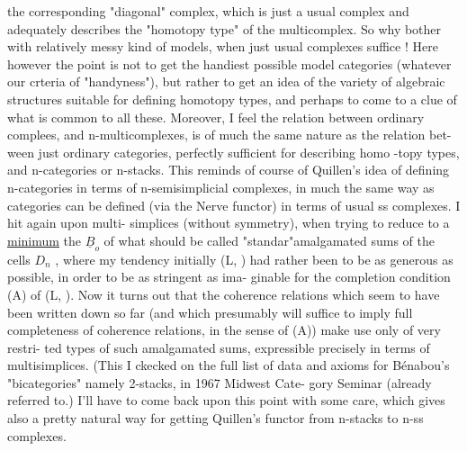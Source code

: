 the corresponding "diagonal" complex,  which is just a usual complex and
adequately describes the "homotopy type" of the multicomplex. So why
bother with relatively messy kind of models,  when just usual complexes
suffice !  Here however the point is not to get the handiest possible
model categories (whatever our crteria of "handyness"),  but rather to
get an idea of the variety of algebraic structures suitable for defining
homotopy types,  and perhaps to come to a clue of what is common to all
these.  Moreover,  I feel the relation between ordinary complees,
and n-multicomplexes,  is of much the same nature as the relation bet-%
ween just ordinary categories,  perfectly sufficient for describing homo
-topy types,  and  n-categories  or n-stacks.  This reminds of course of
Quillen's idea of defining n-categories in terms of n-semisimplicial
complexes,  in much the same way as categories can be defined (via the
Nerve functor)  in terms of usual ss complexes.  I hit again upon multi-%
simplices (without symmetry),  when trying to reduce to a \uline{minimum} the
 $\underline{B}_o$ of  what should be called "standar"amalgamated
sums of the cells $D_n$ ,  where my tendency initially (L, ) had rather
been to be as generous as possible,  in order to be as stringent as ima-%
ginable  for the completion condition (A)  of (L, ).  Now it turns
out that the coherence relations which seem to have been written down so
far (and  which presumably will suffice to imply full completeness of
coherence relations,  in the sense of (A))  make use only of very restri-%
ted types of such amalgamated sums,  expressible precisely in terms of
multisimplices.  (This I ckecked  on the full list of data and axioms
for Bénabou's "bicategories" namely  2-stacks,  in  1967 Midwest Cate-%
gory Seminar  (already referred to.)  I'll have to come back upon this
point with some care,  which gives also a pretty natural way for getting
Quillen's functor from  n-stacks to n-ss complexes.

